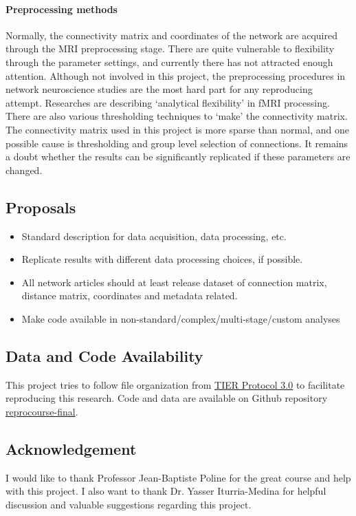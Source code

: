 \documentclass{article}
\begin{document}
\paragraph{Preprocessing methods} 
Normally, the connectivity matrix and coordinates of the network are acquired through the MRI preprocessing stage. There are quite vulnerable to flexibility through the parameter settings, and currently there has not attracted enough attention. Although not involved in this project, the preprocessing procedures in network neuroscience studies are the most hard part for any reproducing attempt. Researches are describing `analytical flexibility' in fMRI processing\cite{carp_plurality_2012, bowring_exploring_2018}. There are also various thresholding techniques to `make' the connectivity matrix. The connectivity matrix used in this project is more sparse than normal, and one possible cause is thresholding and group level selection of connections. It remains a doubt whether the results can be significantly replicated if these parameters are changed.

\subsection*{Proposals}
\begin{itemize}
    \item Standard description for data acquisition, data processing, etc.
    \item Replicate results with different data processing choices, if possible. 
    \item All network articles should at least release dataset of connection matrix, distance matrix, coordinates and metadata related.
    \item Make code available in non-standard/complex/multi-stage/custom analyses
\end{itemize}

\subsection*{Data and Code Availability}

This project tries to follow file organization from \href{https://www.projecttier.org/tier-protocol/}{TIER Protocol 3.0} to facilitate reproducing this research. Code and data are available on Github repository \href{https://github.com/liuzhenqi77/reprocourse-final}{reprocourse-final}.

\subsection*{Acknowledgement}
I would like to thank Professor Jean-Baptiste Poline for the great course and help with this project. I also want to thank Dr. Yasser Iturria-Medina for helpful discussion and valuable suggestions regarding this project.
\end{document}
